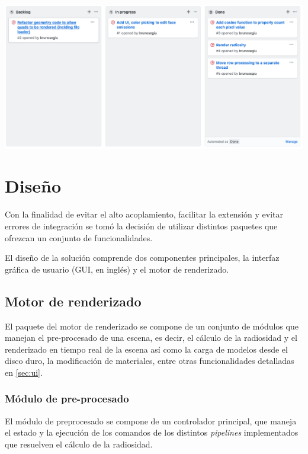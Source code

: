 \vspace{5mm}
\begin{minipage}[h]{0.8\linewidth}
	\centering
	\includegraphics[width=\linewidth]{assets/kanban}
	\label{img:kanban}
\end{minipage}

\section{Diseño}
\label{sec:disenio}

Con la finalidad de evitar el alto acoplamiento, facilitar la extensión y evitar errores de integración se tomó la decisión de utilizar distintos paquetes que ofrezcan un conjunto de funcionalidades.

El diseño de la solución comprende dos componentes principales, la interfaz gráfica de usuario (GUI, en inglés) y el motor de renderizado.

\subsection{Motor de renderizado}
\label{sec:engine}

El paquete del motor de renderizado se compone de un conjunto de módulos que manejan el pre-procesado de una escena, es decir, el cálculo de la radiosidad y el renderizado en tiempo real de la escena así como la carga de modelos desde el disco duro, la modificación de materiales, entre otras funcionalidades detalladas en \ref{sec:ui}.

\subsubsection{Módulo de pre-procesado}

El módulo de preprocesado se compone de un controlador principal, que maneja el estado y la ejecución de  los comandos de los distintos \textit{pipelines} implementados que resuelven el cálculo de la radiosidad.

